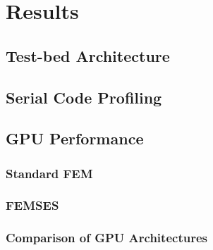 \clearpage
\chapter{Results}

\section{Test-bed Architecture}

\section{Serial Code Profiling}

\section{GPU Performance}

\subsection{Standard FEM}

\subsection{FEMSES}

\subsection{Comparison of GPU Architectures}